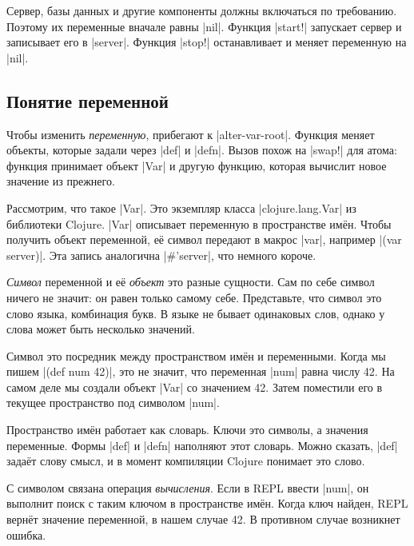 Сервер, базы данных и другие компоненты должны включаться по требованию. Поэтому
их переменные вначале равны \spverb|nil|. Функция \spverb|start!| запускает
сервер и записывает его в \spverb|server|. Функция \spverb|stop!| останавливает
и меняет переменную на \spverb|nil|.

\subsection{Понятие переменной}


\label{var-section}

Чтобы изменить \emph{переменную}, прибегают к \spverb|alter-var-root|. Функция
меняет объекты, которые задали через \spverb|def| и \spverb|defn|. Вызов похож
на \spverb|swap!| для атома: функция принимает объект \spverb|Var| и другую
функцию, которая вычислит новое значение из прежнего.


Рассмотрим, что такое \spverb|Var|. Это экземпляр класса \spverb|clojure.lang.Var|
из библиотеки Clojure. \spverb|Var| описывает переменную в пространстве им\"{е}н.
Чтобы получить объект переменной, е\"{е} символ передают в макрос \spverb|var|,
например \spverb|(var server)|. Эта запись аналогична \spverb|#'server|,
что немного короче.


\emph{Символ} переменной и е\"{е} \emph{объект} это разные сущности. Сам по себе
символ ничего не значит: он равен только самому себе. Представьте, что символ
это слово языка, комбинация букв. В языке не бывает одинаковых слов, однако у
слова может быть несколько значений.


Символ это посредник между пространством им\"{е}н и переменными. Когда мы пишем
\spverb|(def num 42)|, это не значит, что переменная \spverb|num| равна числу
42. На самом деле мы создали объект \spverb|Var| со значением 42. Затем
поместили его в текущее пространство под символом \spverb|num|.

Пространство им\"{е}н работает как словарь. Ключи это символы, а значения
переменные. Формы \spverb|def| и \spverb|defn| наполняют этот словарь. Можно
сказать, \spverb|def| зада\"{е}т слову смысл, и в момент компиляции Clojure
понимает это слово.

С символом связана операция \emph{вычисления}. Если в REPL ввести \spverb|num|,
он выполнит поиск с таким ключом в пространстве им\"{е}н. Когда ключ найден, REPL
верн\"{е}т значение переменной, в нашем случае 42. В противном случае возникнет
ошибка.

